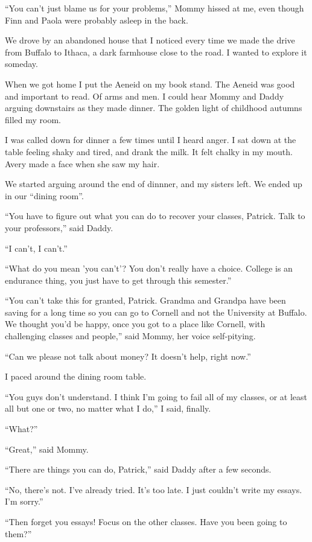 ``You can't just blame us for your problems,'' Mommy hissed at me, even though Finn
and Paola were probably asleep in the back.

We drove by an abandoned house that I noticed every time we made the drive from
Buffalo to Ithaca, a dark farmhouse close to the road.  I wanted to
explore it someday.

When we got home I put the Aeneid on my book stand.  The Aeneid was good and
important to read.  Of arms and men.  I could hear Mommy and Daddy arguing
downstairs as they made dinner.   The golden light of childhood autumns filled
my room.

I was called down for dinner a few times until I heard anger.  I sat down at the
table feeling shaky and tired, and drank the milk.  It felt chalky in my mouth.
Avery made a face when she saw my hair.

We started arguing around the end of dinnner, and my sisters left.  We ended up
in our ``dining room''.

``You have to figure out what you can do to recover your classes, Patrick.  Talk
to your professors,'' said Daddy.

``I can't, I can't.'' 

``What do you mean 'you can't'?  You don't really have a choice.  College is an
endurance thing, you just have to get through this semester.''

``You can't take this for granted, Patrick.  Grandma and Grandpa have been saving
for a long time so you can go to Cornell and not the University at Buffalo.  We
thought you'd be happy, once you got to a place like Cornell, with challenging
classes and people,'' said Mommy, her voice self-pitying.

``Can we please not talk about money?  It doesn't help, right now.''

I paced around the dining room table.

``You guys don't understand.  I think I'm going to fail all of my classes, or at
least all but one or two, no matter what I do,'' I said, finally.

``What?''

``Great,'' said Mommy.

``There are things you can do, Patrick,'' said Daddy after a few seconds.

``No, there's not.  I've already tried.  It's too late.  I just couldn't write my essays.  I'm
sorry.''

``Then forget you essays!  Focus on the other classes.  Have you been going to
them?''

